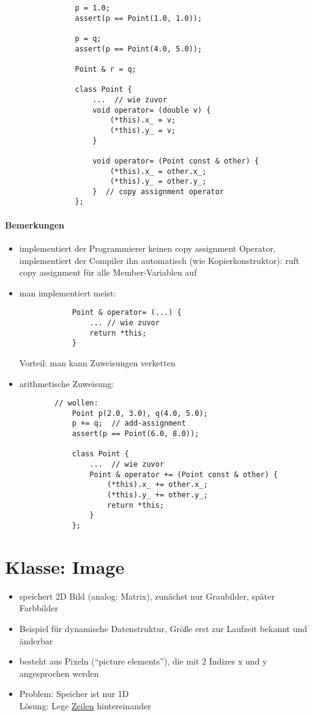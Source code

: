 \documentclass{article}
\begin{document}
\begin{itemize}
\begin{enumerate}
\begin{lstlisting}
				p = 1.0;
				assert(p == Point(1.0, 1.0));

				p = q;
				assert(p == Point(4.0, 5.0));

				Point & r = q;

				class Point {
					...  // wie zuvor
					void operator= (double v) {
						(*this).x_ = v;
						(*this).y_ = v;
					}

					void operator= (Point const & other) {
						(*this).x_ = other.x_;
						(*this).y_ = other.y_;
					}  // copy assignment operator
				};
			\end{lstlisting}
		\end{enumerate}
	\end{itemize}

\paragraph*{Bemerkungen}
	\begin{itemize}
		\item implementiert der Programmierer keinen copy assignment Operator, implementiert der Compiler ihn automatisch (wie Kopierkonstruktor): ruft copy assignment für alle Member-Variablen auf
		\item man implementiert meist:
		\begin{lstlisting}
			Point & operator= (...) {
				... // wie zuvor
				return *this;
			}
		\end{lstlisting}
		Vorteil: man kann Zuweisungen verketten
		\item arithmetische Zuweisung:
		\begin{lstlisting}
		// wollen:
			Point p(2.0, 3.0), q(4.0, 5.0);
			p += q;  // add-assignment
			assert(p == Point(6.0, 8.0));

			class Point {
				...  // wie zuvor
				Point & operator += (Point const & other) {
					(*this).x_ += other.x_;
					(*this).y_ += other.y_;
					return *this;
				}
			};
		\end{lstlisting}
	\end{itemize}

\section{Klasse: Image}
	\begin{itemize}
		\item speichert 2D Bild (analog: Matrix), zunächst nur Graubilder, später Farbbilder
		\item Beispiel für dynamische Datenstruktur, Größe erst zur Laufzeit bekannt und änderbar
		\item besteht aus Pixeln (``picture elements''), die mit 2 Indizes x und y angesprochen werden
		\item Problem: Speicher ist nur 1D \\
		Lösung: Lege \underline{Zeilen} hintereinander
	\end{itemize}
\end{document}
